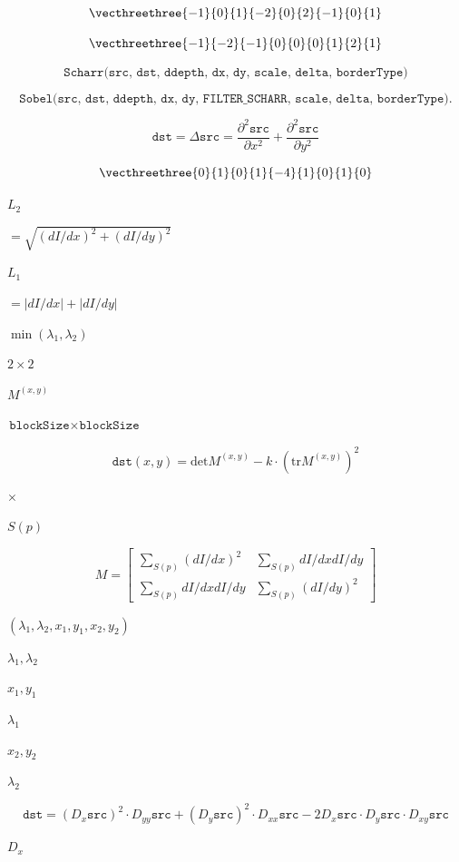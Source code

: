 \documentclass{article}
\begin{document}
\[\vecthreethree{-1}{0}{1}{-2}{0}{2}{-1}{0}{1}\]
\pagebreak

\[\vecthreethree{-1}{-2}{-1}{0}{0}{0}{1}{2}{1}\]
\pagebreak

\[\texttt{Scharr(src, dst, ddepth, dx, dy, scale, delta, borderType)}\]
\pagebreak

\[\texttt{Sobel(src, dst, ddepth, dx, dy, FILTER_SCHARR, scale, delta, borderType)} .\]
\pagebreak

\[\texttt{dst} =  \Delta \texttt{src} =  \frac{\partial^2 \texttt{src}}{\partial x^2} +  \frac{\partial^2 \texttt{src}}{\partial y^2}\]
\pagebreak

\[\vecthreethree {0}{1}{0}{1}{-4}{1}{0}{1}{0}\]
\pagebreak

$L_2$
\pagebreak

$=\sqrt{(dI/dx)^2 + (dI/dy)^2}$
\pagebreak

$L_1$
\pagebreak

$=|dI/dx|+|dI/dy|$
\pagebreak

$\min(\lambda_1, \lambda_2)$
\pagebreak

$2\times2$
\pagebreak

$M^{(x,y)}$
\pagebreak

$\texttt{blockSize} \times \texttt{blockSize}$
\pagebreak

\[\texttt{dst} (x,y) =  \mathrm{det} M^{(x,y)} - k  \cdot \left ( \mathrm{tr} M^{(x,y)} \right )^2\]
\pagebreak

$\times$
\pagebreak

$S(p)$
\pagebreak

\[M =  \begin{bmatrix} \sum _{S(p)}(dI/dx)^2 &  \sum _{S(p)}dI/dx dI/dy  \\ \sum _{S(p)}dI/dx dI/dy &  \sum _{S(p)}(dI/dy)^2 \end{bmatrix}\]
\pagebreak

$(\lambda_1, \lambda_2, x_1, y_1, x_2, y_2)$
\pagebreak

$\lambda_1, \lambda_2$
\pagebreak

$x_1, y_1$
\pagebreak

$\lambda_1$
\pagebreak

$x_2, y_2$
\pagebreak

$\lambda_2$
\pagebreak

\[\texttt{dst} = (D_x  \texttt{src} )^2  \cdot D_{yy}  \texttt{src} + (D_y  \texttt{src} )^2  \cdot D_{xx}  \texttt{src} - 2 D_x  \texttt{src} \cdot D_y  \texttt{src} \cdot D_{xy}  \texttt{src}\]
\pagebreak

$D_x$
\pagebreak
\end{document}
